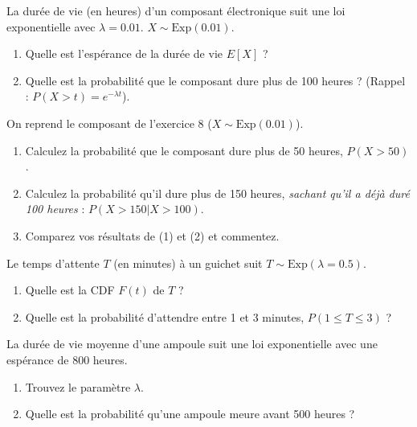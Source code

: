 
\begin{exercicebox}
La durée de vie (en heures) d'un composant électronique suit une loi exponentielle avec $\lambda = 0.01$. $X \sim \text{Exp}(0.01)$.
\begin{enumerate}
    \item Quelle est l'espérance de la durée de vie $E[X]$ ?
    \item Quelle est la probabilité que le composant dure plus de 100 heures ? (Rappel : $P(X > t) = e^{-\lambda t}$).
\end{enumerate}
\end{exercicebox}

\begin{exercicebox}
On reprend le composant de l'exercice 8 ($X \sim \text{Exp}(0.01)$).
\begin{enumerate}
    \item Calculez la probabilité que le composant dure plus de 50 heures, $P(X > 50)$.
    \item Calculez la probabilité qu'il dure plus de 150 heures, \textit{sachant qu'il a déjà duré 100 heures} : $P(X > 150 | X > 100)$.
    \item Comparez vos résultats de (1) et (2) et commentez.
\end{enumerate}
\end{exercicebox}

\begin{exercicebox}
Le temps d'attente $T$ (en minutes) à un guichet suit $T \sim \text{Exp}(\lambda=0.5)$.
\begin{enumerate}
    \item Quelle est la CDF $F(t)$ de $T$ ?
    \item Quelle est la probabilité d'attendre entre 1 et 3 minutes, $P(1 \le T \le 3)$ ?
\end{enumerate}
\end{exercicebox}

\begin{exercicebox}
La durée de vie moyenne d'une ampoule suit une loi exponentielle avec une espérance de 800 heures.
\begin{enumerate}
    \item Trouvez le paramètre $\lambda$.
    \item Quelle est la probabilité qu'une ampoule meure avant 500 heures ?
\end{enumerate}
\end{exercicebox}

